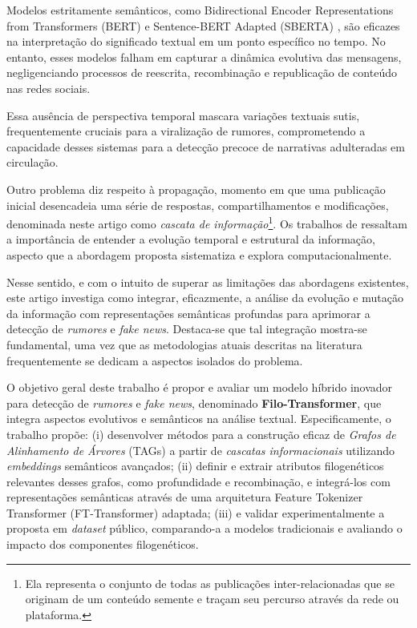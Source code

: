 \documentclass[12pt]{article}
\begin{document}
Modelos estritamente semânticos, como Bidirectional Encoder Representations from Transformers (BERT) \cite{devlin2019bert} e Sentence-BERT Adapted (SBERTA) \cite{reimers2019sentence}, são eficazes na interpretação do significado textual em um ponto específico no tempo. No entanto, esses modelos falham em capturar a dinâmica evolutiva das mensagens, negligenciando processos de reescrita, recombinação e republicação de conteúdo nas redes sociais.

Essa ausência de perspectiva temporal mascara variações textuais sutis, frequentemente cruciais para a viralização de rumores, comprometendo a capacidade desses sistemas para a detecção precoce de narrativas adulteradas em circulação.

Outro problema diz respeito à propagação, momento em que uma publicação inicial desencadeia uma série de respostas, compartilhamentos e modificações, denominada neste artigo como \textit{cascata de informação}\footnote{Ela representa o conjunto de todas as publicações inter-relacionadas que se originam de um conteúdo semente e traçam seu percurso através da rede ou plataforma.}. Os trabalhos de \cite{peng2024infodemiology, qiu2022entropy} ressaltam a importância de entender a evolução temporal e estrutural da informação, aspecto que a abordagem proposta sistematiza e explora computacionalmente.

Nesse sentido, e com o intuito de superar as limitações das abordagens existentes, este artigo investiga como integrar, eficazmente, a análise da evolução e mutação da informação com representações semânticas profundas para aprimorar a detecção de \textit{rumores} e \textit{fake news}. Destaca-se que tal integração mostra-se fundamental, uma vez que as metodologias atuais descritas na literatura frequentemente se dedicam a aspectos isolados do problema.

O objetivo geral deste trabalho é propor e avaliar um modelo híbrido inovador para detecção de \textit{rumores} e \textit{fake news}, denominado \textbf{Filo-Transformer}, que integra aspectos evolutivos e semânticos na análise textual. Especificamente, o trabalho propõe: (i) desenvolver métodos para a construção eficaz de \textit{Grafos de Alinhamento de Árvores} (TAGs) \cite{smith2013tag} a partir de \textit{cascatas informacionais} utilizando \textit{embeddings} semânticos avançados; (ii) definir e extrair atributos filogenéticos relevantes desses grafos, como profundidade e recombinação, e integrá-los com representações semânticas através de uma arquitetura Feature Tokenizer Transformer (FT-Transformer) \cite{gorishniy2021fttransformer} adaptada; (iii) e validar experimentalmente a proposta em \textit{dataset} público, comparando-a a modelos tradicionais e avaliando o impacto dos componentes filogenéticos.
\end{document}
